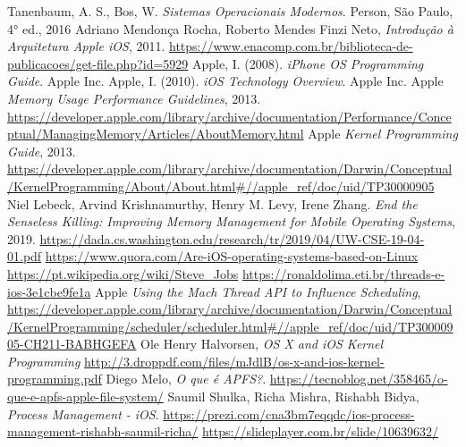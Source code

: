 \documentclass[conference]{IEEEtran}
\begin{document}
\begin{thebibliography}{00}
 Tanenbaum, A. S., Bos, W. \textit{Sistemas Operacionais Modernos}. Person, São Paulo, 4° ed., 2016
 Adriano Mendonça Rocha, Roberto Mendes Finzi Neto, \textit{Introdução à Arquitetura Apple iOS}, 2011. \url{https://www.enacomp.com.br/biblioteca-de-publicacoes/get-file.php?id=5929}
 Apple, I. (2008). \textit{iPhone OS Programming Guide}. Apple Inc.
 Apple, I. (2010). \textit{iOS Technology Overview}. Apple Inc.
 Apple \textit{Memory Usage Performance Guidelines}, 2013. \url{https://developer.apple.com/library/archive/documentation/Performance/Conceptual/ManagingMemory/Articles/AboutMemory.html}
 Apple \textit{Kernel Programming Guide}, 2013. \url{https://developer.apple.com/library/archive/documentation/Darwin/Conceptual/KernelProgramming/About/About.html#//apple\_ref/doc/uid/TP30000905}
 Niel Lebeck, Arvind Krishnamurthy, Henry M. Levy, Irene Zhang. \textit{End the Senseless Killing: Improving Memory Management for Mobile Operating Systems}, 2019. \url{https://dada.cs.washington.edu/research/tr/2019/04/UW-CSE-19-04-01.pdf}
 \url{https://www.quora.com/Are-iOS-operating-systems-based-on-Linux}
 \url{https://pt.wikipedia.org/wiki/Steve_Jobs}
 \url{https://ronaldolima.eti.br/threads-e-ios-3e1cbe9fe1a}
 Apple \textit{Using the Mach Thread API to Influence Scheduling}, \url{https://developer.apple.com/library/archive/documentation/Darwin/Conceptual/KernelProgramming/scheduler/scheduler.html#//apple_ref/doc/uid/TP30000905-CH211-BABHGEFA}
 Ole Henry Halvorsen, \textit{OS X and iOS Kernel Programming} \url{http://3.droppdf.com/files/mJdlB/os-x-and-ios-kernel-programming.pdf}
 Diego Melo, \textit{O que é APFS?}. \url{https://tecnoblog.net/358465/o-que-e-apfs-apple-file-system/}
 Saumil Shulka, Richa Mishra, Rishabh Bidya, \textit{Process Management - iOS}. \url{https://prezi.com/cna3bm7eqqdc/ios-process-management-rishabh-saumil-richa/}
 \url{https://slideplayer.com.br/slide/10639632/}
\end{thebibliography}
\end{document}

